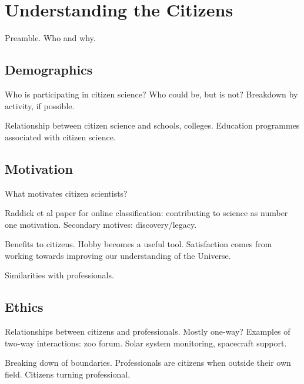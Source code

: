 \documentclass{ar2e}
\begin{document}

\section{Understanding the Citizens}
\label{sec:crowd}

Preamble. Who and why.


\subsection{Demographics}
\label{sec:crowd:demographics}

Who is participating in citizen science? Who could be, but is not?
Breakdown by activity, if possible.

Relationship between citizen science and schools, colleges. Education programmes
associated with citizen science.


\subsection{Motivation}
\label{sec:crowd:motive}

What motivates citizen scientists?

Raddick et al paper for online classification: contributing to science as number
one motivation. Secondary motives: discovery/legacy.

Benefits to citizens.  Hobby becomes a useful tool. Satisfaction comes from
working towards improving our understanding of the Universe.

Similarities with professionals. 


\subsection{Ethics}
\label{sec:crowd:ethics}

Relationships between citizens and professionals. Mostly one-way? Examples of
two-way interactions: zoo forum. Solar system monitoring, spacecraft support.

Breaking down of boundaries. Professionals are citizens when outside their own
field. Citizens turning professional.
\end{document}
